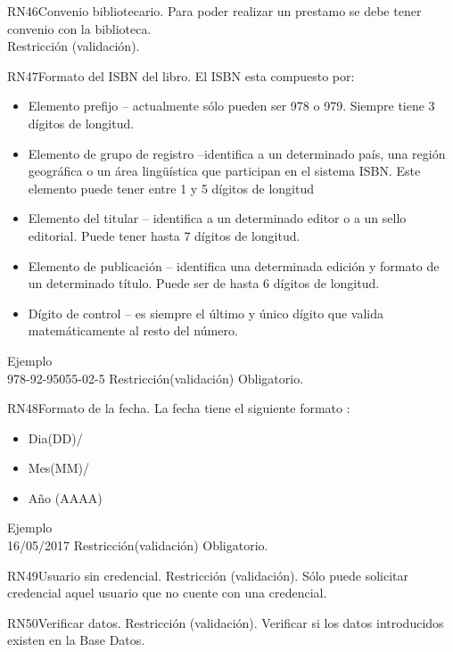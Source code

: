 \begin{BussinesRule}{RN46}{Convenio bibliotecario.} 
	\BRitem[Descripción:] Para poder realizar un prestamo se debe tener convenio con la biblioteca.\\
	\BRitem[Tipo:] Restricción (validación).
\end{BussinesRule}

\begin{BussinesRule}{RN47}{Formato del ISBN del libro.}
	\BRitem[Descripción:] El ISBN esta compuesto por:
		\begin{itemize} 
			\item Elemento prefijo – actualmente sólo pueden ser 978 o 979. Siempre tiene 3 dígitos de longitud.
			\item Elemento de grupo de registro –identifica a un determinado país, una región geográfica o un área lingüística que participan en el sistema ISBN. Este elemento puede tener entre 1 y 5 dígitos de longitud
			\item Elemento del titular – identifica a un determinado editor o a un sello editorial. Puede tener hasta 7 dígitos de longitud. 
			\item Elemento de publicación – identifica una determinada edición y formato de un determinado título. Puede ser de hasta 6 dígitos de longitud. 
			\item Dígito de control – es siempre el último y único dígito que valida matemáticamente al resto del número. 
		\end{itemize}
Ejemplo \\
	978-92-95055-02-5
	\BRitem[Tipo:] Restricción(validación)
	\BRitem[Nivel:] Obligatorio.
\end{BussinesRule}


\begin{BussinesRule}{RN48}{Formato de la fecha.}
	\BRitem[Descripción:] La fecha tiene el siguiente formato :
		\begin{itemize} 
			\item Dia(DD)/ 
			\item Mes(MM)/
			\item Año (AAAA)
		\end{itemize}
Ejemplo \\
	16/05/2017
	\BRitem[Tipo:] Restricción(validación)
	\BRitem[Nivel:] Obligatorio.
\end{BussinesRule}

\begin{BussinesRule}{RN49}{Usuario sin credencial.}
	\BRitem[Tipo:] Restricción (validación).
	\BRitem[Descripción:] Sólo puede solicitar credencial aquel usuario que no cuente con una credencial.
\end{BussinesRule}

\begin{BussinesRule}{RN50}{Verificar datos.}
	\BRitem[Tipo:] Restricción (validación).
	\BRitem[Descripción:] Verificar si los datos introducidos existen en la Base Datos.
\end{BussinesRule}

